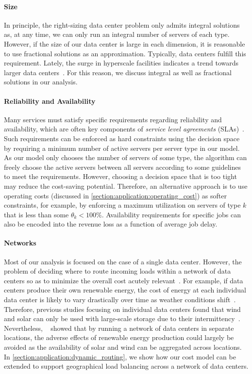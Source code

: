 \paragraph{Size} In principle, the right-sizing data center problem only admits integral solutions as, at any time, we can only run an integral number of servers of each type. However, if the size of our data center is large in each dimension, it is reasonable to use fractional solutions as an approximation. Typically, data centers fulfill this requirement. Lately, the surge in hyperscale facilities indicates a trend towards larger data centers~\cite{Jones2018}. For this reason, we discuss integral as well as fractional solutions in our analysis.

\paragraph{Reliability and Availability} Many services must satisfy specific requirements regarding reliability and availability, which are often key components of \emph{service level agreements} (SLAs)~\cite{Lin2011}. Such requirements can be enforced as hard constraints using the decision space by requiring a minimum number of active servers per server type in our model. As our model only chooses the number of servers of some type, the algorithm can freely choose the active servers between all servers according to some guidelines to meet the requirements. However, choosing a decision space that is too tight may reduce the cost-saving potential. Therefore, an alternative approach is to use operating costs (discussed in \cref{section:application:operating_cost}) as softer constraints, for example, by enforcing a maximum utilization on servers of type $k$ that is less than some $\theta_k < 100\%$. Availability requirements for specific jobs can also be encoded into the revenue loss as a function of average job delay.

\paragraph{Networks} Most of our analysis is focused on the case of a single data center. However, the problem of deciding where to route incoming loads within a network of data centers so as to minimize the overall cost acutely relevant~\cite{Miller2021}. For example, if data centers produce their own renewable energy, the cost of energy at each individual data center is likely to vary drastically over time as weather conditions shift~\cite{Lin2012}. Therefore, previous studies focusing on individual data centers found that wind and solar can only be used with large-scale storage due to their intermittency~\cite{Gmach2010, Gmach2010_2}. Nevertheless, \citeauthor*{Lin2012}~\cite{Lin2012} showed that by running a network of data centers in separate locations, the adverse effects of renewable energy production could largely be avoided as the availability of solar and wind can be aggregated across locations. In \cref{section:application:dynamic_routing}, we show how our cost model can be extended to support geographical load balancing across a network of data centers.

